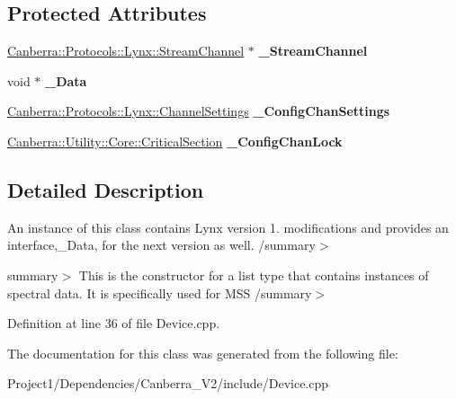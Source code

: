 \subsection*{Protected Attributes}
\begin{DoxyCompactItemize}
\item 
\mbox{\label{class_extensions_ace1689b4e81e4323fbb98b8b473ecdcb}} 
\hyperlink{class_canberra_1_1_protocols_1_1_lynx_1_1_stream_channel}{Canberra\+::\+Protocols\+::\+Lynx\+::\+Stream\+Channel} $\ast$ {\bfseries \+\_\+\+Stream\+Channel}
\item 
\mbox{\label{class_extensions_ab850f92f4443aafad2fea5f9ea997a65}} 
void $\ast$ {\bfseries \+\_\+\+Data}
\item 
\mbox{\label{class_extensions_a9ffb8e2f63950cf6fae8e655eb19ab71}} 
\hyperlink{class_canberra_1_1_protocols_1_1_lynx_1_1_channel_settings}{Canberra\+::\+Protocols\+::\+Lynx\+::\+Channel\+Settings} {\bfseries \+\_\+\+Config\+Chan\+Settings}
\item 
\mbox{\label{class_extensions_a71f6ddc145a71351b48f918db00bf740}} 
\hyperlink{class_canberra_1_1_utility_1_1_core_1_1_critical_section}{Canberra\+::\+Utility\+::\+Core\+::\+Critical\+Section} {\bfseries \+\_\+\+Config\+Chan\+Lock}
\end{DoxyCompactItemize}


\subsection{Detailed Description}
An instance of this class contains Lynx version 1. modifications and provides an interface,\+\_\+\+Data, for the next version as well. /summary$>$ 

summary$>$ This is the constructor for a list type that contains instances of spectral data. It is specifically used for M\+SS /summary$>$ 

Definition at line 36 of file Device.\+cpp.



The documentation for this class was generated from the following file\+:\begin{DoxyCompactItemize}
\item 
Project1/\+Dependencies/\+Canberra\+\_\+\+V2/include/Device.\+cpp\end{DoxyCompactItemize}

